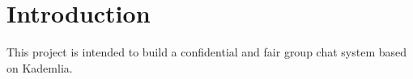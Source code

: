 \chapter{Introduction}
\label{cha:introduction}

This project is intended to build a confidential and fair group chat system based on Kademlia.

%
%
%
%
%
